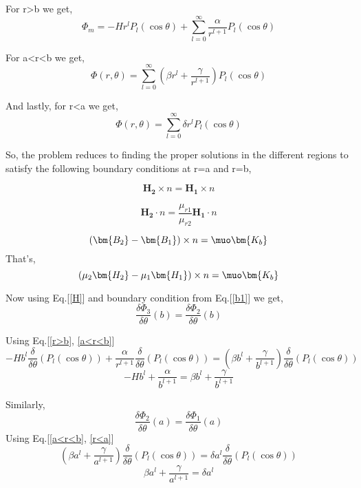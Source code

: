 For r\textgreater b we get,
\begin{equation}\label{r>b}
\Phi_m=-Hr^lP_l(\cos\theta)+\sum_{l=0}^{\infty}\frac{\alpha}{r^{l+1}}P_l(\cos\theta)
\end{equation}

For a\textless r\textless b we get,
\begin{equation}\label{a<r<b}
\Phi(r,\theta)=\sum_{l=0}^{\infty} \left(\beta r^l+\frac{\gamma}{r^{l+1}}\right)P_l(\cos\theta)
\end{equation}

And lastly, for r\textless a we get,
\begin{equation}\label{r<a}
\Phi(r,\theta)=\sum_{l=0}^{\infty} \delta r^l P_l(\cos\theta)
\end{equation}

So, the problem reduces to finding the proper solutions in the different regions to satisfy the following boundary conditions at r=a and r=b,


\begin{equation}\label{b1}   
\bm{H_2}\times n = \bm{H_1}\times n  
\end{equation}

\begin{equation}\label{b2}   
\bm{H_2}\cdot n=\frac{\mu_{r1}}{\mu_{r2}}\bm{H_1}\cdot n
\end{equation}

$$(\bm{B_2} - \bm{B_1})\times n = \muo \bm{K_b}$$
That's,
\begin{equation}\label{b3}   
(\mu_2\bm{H_2} - \mu_1\bm{H_1})\times n = \muo \bm{K_b}  
\end{equation}

Now using Eq.[\ref{H}] and boundary condition from Eq.[\ref{b1}] we get,
$$\frac{\delta \Phi_3}{\delta \theta}(b)=\frac{\delta \Phi_2}{\delta \theta}(b)$$

Using Eq.[\ref{r>b}, \ref{a<r<b}]
$$-Hb^l\frac{\delta}{\delta \theta}(P_l(\cos\theta))+\frac{\alpha}{r^{l+1}}\frac{\delta}{\delta \theta}(P_l(\cos\theta))=\left(\beta b^l+\frac{\gamma}{b^{l+1}}\right)\frac{\delta}{\delta \theta}(P_l(\cos\theta))$$
\begin{equation}\label{e01}
-Hb^l+\frac{\alpha}{b^{l+1}}=\beta b^l+\frac{\gamma}{b^{l+1}}
\end{equation}

Similarly,
$$\frac{\delta \Phi_2}{\delta \theta}(a)=\frac{\delta \Phi_1}{\delta \theta}(a)$$
Using Eq.[\ref{a<r<b}, \ref{r<a}]
$$\left(\beta a^l+\frac{\gamma}{a^{l+1}}\right)\frac{\delta}{\delta \theta}(P_l(\cos\theta))=\delta a^l \frac{\delta}{\delta \theta}(P_l(\cos\theta))$$
\begin{equation}\label{e02}
\beta a^l+\frac{\gamma}{a^{l+1}}=\delta a^l
\end{equation}

